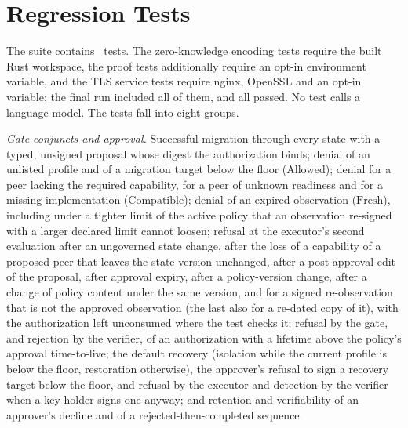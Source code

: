 \documentclass[journal]{IEEEtran}
\newcommand{\Fresh}{\mathrm{Fresh}}
\newcommand{\Allowed}{\mathrm{Allowed}}
\newcommand{\Compatible}{\mathrm{Compatible}}
\begin{document}
\section{Regression Tests}
\label{s:tests}
The suite contains \NumTests\ tests. The zero-knowledge encoding tests require the built Rust workspace, the proof tests additionally require an opt-in environment variable, and the TLS service tests require nginx, OpenSSL and an opt-in variable; the final run included all of them, and all passed. No test calls a language model. The tests fall into eight groups.

\emph{Gate conjuncts and approval.} Successful migration through every state with a typed, unsigned proposal whose digest the authorization binds; denial of an unlisted profile and of a migration target below the floor ($\Allowed$); denial for a peer lacking the required capability, for a peer of unknown readiness and for a missing implementation ($\Compatible$); denial of an expired observation ($\Fresh$), including under a tighter limit of the active policy that an observation re-signed with a larger declared limit cannot loosen; refusal at the executor's second evaluation after an ungoverned state change, after the loss of a capability of a proposed peer that leaves the state version unchanged, after a post-approval edit of the proposal, after approval expiry, after a policy-version change, after a change of policy content under the same version, and for a signed re-observation that is not the approved observation (the last also for a re-dated copy of it), with the authorization left unconsumed where the test checks it; refusal by the gate, and rejection by the verifier, of an authorization with a lifetime above the policy's approval time-to-live; the default recovery (isolation while the current profile is below the floor, restoration otherwise), the approver's refusal to sign a recovery target below the floor, and refusal by the executor and detection by the verifier when a key holder signs one anyway; and retention and verifiability of an approver's decline and of a rejected-then-completed sequence.
\end{document}
